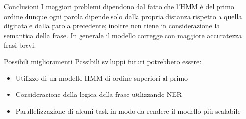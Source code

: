 \documentclass[aspectratio=169]{beamer}
\begin{document}
\begin{frame}{Conclusioni}
  I maggiori problemi dipendono dal fatto che l'HMM è del primo ordine dunque ogni parola dipende solo dalla propria distanza rispetto a quella 
digitata 
  e dalla parola precedente; inoltre non tiene in considerazione la semantica della frase. In generale il modello corregge con maggiore accuratezza 
frasi
  brevi.
\end{frame}
\begin{frame}{Possibili miglioramenti}
	Possibili sviluppi futuri potrebbero essere:
    \begin{itemize}
    	\item Utilizzo di un modello HMM di ordine superiori al primo
        \item Considerazione della logica della frase utilizzando NER
        \item Parallelizzazione di alcuni task in modo da rendere il modello più scalabile
    \end{itemize}
\end{frame}
\end{document}

